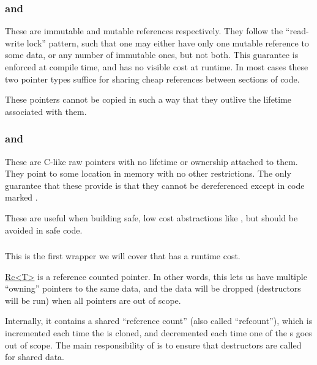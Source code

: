 \subsubsection*{ and }

These are immutable and mutable references respectively. They follow the \enquote{read-write lock} pattern, such that one 
may either have only one mutable reference to some data, or any number of immutable ones, but not both. This guarantee is 
enforced at compile time, and has no visible cost at runtime. In most cases these two pointer types suffice for sharing 
cheap references between sections of code.

\blank

These pointers cannot be copied in such a way that they outlive the lifetime associated with them.

\subsubsection*{ and }

These are C-like raw pointers with no lifetime or ownership attached to them. They point to some location in memory 
with no other restrictions. The only guarantee that these provide is that they cannot be dereferenced except in code 
marked .

\blank

These are useful when building safe, low cost abstractions like , but should be avoided in safe code.

\subsubsection*{}

This is the first wrapper we will cover that has a runtime cost.

\blank

\href{https://doc.rust-lang.org/std/rc/struct.Rc.html}{Rc<T>} is a reference counted pointer. In other words, this lets 
us have multiple \enquote{owning} pointers to the same data, and the data will be dropped (destructors will be run) when 
all pointers are out of scope.

\blank

Internally, it contains a shared \enquote{reference count} (also called \enquote{refcount}), which is incremented each 
time the  is cloned, and decremented each time one of the s goes out of scope. The main responsibility 
of  is to ensure that destructors are called for shared data.

